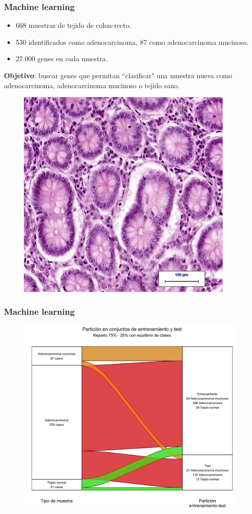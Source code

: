 \documentclass{beamer}
\begin{document}
\begin{frame}\frametitle{Machine learning}
	\begin{itemize}
		\item 668 muestras de tejido de colon-recto.
		\item 530 identificados como adenocarcinoma, 87 como adenocarcinoma mucinoso.
		\item 27.000 genes en cada muestra.
	\end{itemize}
	\textbf{Objetivo}: buscar genes que permitan ``clasificar" una muestra nueva como adenocarcinoma, adenocarcinoma mucinoso o tejido sano.
	\begin{figure}
		\centering
		\includegraphics[width=.4\textwidth]{images/cr.png}
	\end{figure}
\end{frame}


\begin{frame}\frametitle{Machine learning}
	\begin{figure}
		\centering
		\includegraphics[width=.75\textwidth]{images/35_cr_multiclase_05_sankey.png}
	\end{figure}
\end{frame}
\end{document}
